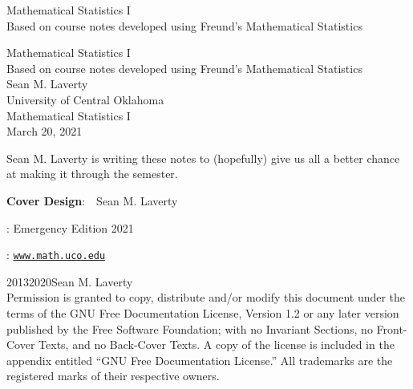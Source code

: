 \documentclass[oneside,10pt,]{book}
\newcommand{\titlepagefont}{\relax}
\newcommand{\mono}[1]{\texttt{#1}}
\begin{document}
\frontmatter
\setcounter{page}{0}%
%
\thispagestyle{empty}
{\titlepagefont\centering
\vspace*{0.28\textheight}
{\Huge Mathematical Statistics I}\\[2\baselineskip]
{\LARGE Based on course notes developed using Freund's Mathematical Statistics}\\
}
\clearpage
\thispagestyle{empty}
\null%
\clearpage
\thispagestyle{empty}
{\titlepagefont\centering
\vspace*{0.14\textheight}
{\Huge Mathematical Statistics I}\\[\baselineskip]
{\LARGE Based on course notes developed using Freund's Mathematical Statistics}\\[3\baselineskip]
{\Large Sean M. Laverty}\\[0.5\baselineskip]
{\Large University of Central Oklahoma}\\[3\baselineskip]
{\Large Mathematical Statistics I}\\[3\baselineskip]
{\Large March 20, 2021}\\}
\clearpage
\thispagestyle{empty}
\hypertarget{x:colophon:front-colophon}{}\noindent
Sean M. Laverty is writing these notes to (hopefully) give us all a better chance at making it through the semester.%
\par
{}
\par\noindent
\textbf{Cover Design}:\ \ Sean M. Laverty
\par{}
: Emergency Edition 2021\par\medskip
{}: \href{http:\slash{}\slash{}www.math.uco.edu}{\mono{www.math.uco.edu}}\par\medskip
\noindent\textcopyright{}2013\textendash{}2020\quad{}Sean M. Laverty\\[0.5\baselineskip]
Permission is granted to copy, distribute and\slash{}or modify this document under the terms of the GNU Free Documentation License, Version 1.2 or any later version published by the Free Software Foundation; with no Invariant Sections, no Front-Cover Texts, and no Back-Cover Texts.  A copy of the license is included in the appendix entitled ``GNU Free Documentation License.''  All trademarks\texttrademark{} are the registered\textregistered{} marks of their respective owners.\par\medskip
\end{document}
